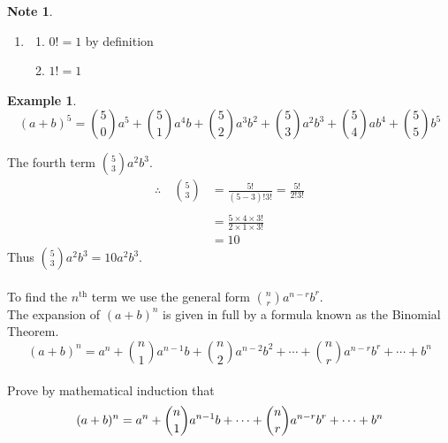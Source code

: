 \documentclass[11pt,a4paper]{article}
\theoremstyle{definition}
\newtheorem{example}[thm]{Example}
\newtheorem{note}[thm]{Note}
\begin{document}
\begin{note}
 
\begin{enumerate}
\item[]
\begin{enumerate}
      \item[] $0!=1$ by definition
      \item[] $1!=1$
\end{enumerate}
\end{enumerate}
\end{note}
\begin{example}

$$(a+b)^5=
\binom{5}{0}
a^5+
\binom{5}{1}
a^4b+
\binom{5}{2}
a^3b^2+
\binom{5}{3}
a^2b^3+
\binom{5}{4}
ab^4+
\binom{5}{5}
b^5
$$


The fourth term $
\binom{5}{3}
a^2b^3
$.
\begin{align*}
\therefore\quad  
\binom{5}{3}
 &= \frac{5!}{(5-3)!3!}=\frac{5!}{2!3!}\\\\
 & = \frac{5\times 4\times 3!}{2\times 1\times 3!}\\
 & = 10
\end{align*}
Thus $
\binom{5}{3}
a^2b^3=10a^2b^3
$.\\\\




To find the $n^{\text{th}}$ term we use the general form $
\binom{n}{r}
a^{n-r}b^r
$.\\
The expansion of $(a+b)^n$ is given in full by a formula known as the Binomial Theorem.
$$(a+b)^n=a^n+
\binom{n}{1}
a^{n-1}b+
\binom{n}{2}
a^{n-2}b^2+\cdots +
\binom{n}{r}
a^{n-r}b^r+\cdots +b^n
$$\\

Prove by mathematical induction that $$(a+b)^n=a^n+\\
\binom{n}{1}
a^{n-1}b+\cdots +
\binom{n}{r}
a^{n-r}b^r+\cdots +b^n
$$
\end{example}
\end{document}
